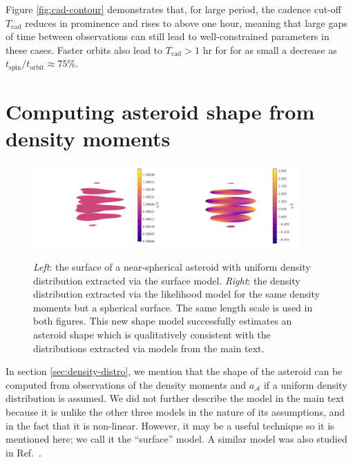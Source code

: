 Figure \ref{fig:cad-contour} demonstrates that, for large period, the cadence cut-off $T_\text{cad}$ reduces in prominence and rises to above one hour, meaning that large gaps of time between observations can still lead to well-constrained parameters in these cases. Faster orbits also lead to $T_\text{cad} > 1$ hr for for as small a decrease as $t_\text{spin} / t_\text{orbit}  \approx 75$\%.


  

\section{Computing asteroid shape from density moments}
\label{app:find-surface}

\begin{figure}
  \centering
  \includegraphics[width=0.45\textwidth]{figs/high-surface.pdf}\hfill
  \includegraphics[width=0.45\textwidth]{figs/high-likelihood.pdf}
  \caption{\textit{Left}: the surface of a near-spherical asteroid with uniform density distribution extracted via the surface model. \textit{Right}: the density distribution extracted via the likelihood model for the same density moments but a spherical surface. The same length scale is used in both figures. This new shape model successfully estimates an asteroid shape which is qualitatively consistent with the distributions extracted via models from the main text.}
  \label{fig:surface-density}
\end{figure}

In section \ref{sec:density-distro}, we mention that the shape of the asteroid can be computed from observations of the density moments and $a_\mathcal{A}$ if a uniform density distribution is assumed. We did not further describe the model in the main text because it is unlike the other three models in the nature of its assumptions, and in the fact that it is non-linear. However, it may be a useful technique so it is mentioned here; we call it the ``surface'' model. A similar model was also studied in Ref.~\cite{BAXANSKY2007756}.

